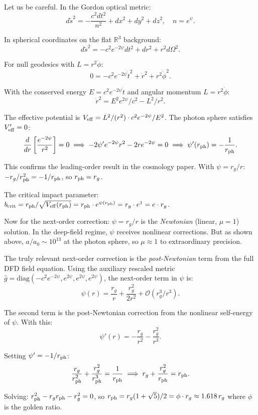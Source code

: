 \documentclass[11pt]{article}
\begin{document}
Let us be careful. In the Gordon optical metric:
\[
d\tilde{s}^2 = -\frac{c^2 dt^2}{n^2} + dx^2 + dy^2 + dz^2, \quad n = e^\psi.
\]

In spherical coordinates on the flat $\mathbb{R}^3$ background:
\[
d\tilde{s}^2 = -c^2 e^{-2\psi} dt^2 + dr^2 + r^2 d\Omega^2.
\]

For null geodesics with $L = r^2\dot\phi$:
\[
0 = -c^2 e^{-2\psi}\dot{t}^2 + \dot{r}^2 + r^2\dot\phi^2.
\]

With the conserved energy $E = c^2 e^{-2\psi}\dot{t}$ and angular momentum $L = r^2\dot\phi$:
\[
\dot{r}^2 = E^2 e^{2\psi}/c^2 - L^2/r^2.
\]

The effective potential is $V_{\rm eff} = L^2/(r^2) \cdot c^2 e^{-2\psi}/E^2$. The photon sphere satisfies $V_{\rm eff}' = 0$:
\[
\frac{d}{dr}\left[\frac{e^{-2\psi}}{r^2}\right] = 0 \implies -2\psi' e^{-2\psi} r^2 - 2r e^{-2\psi} = 0 \implies \psi'(r_{\rm ph}) = -\frac{1}{r_{\rm ph}}.
\]

This confirms the leading-order result in the cosmology paper. With $\psi = r_g/r$:
$-r_g/r_{\rm ph}^2 = -1/r_{\rm ph}$, so $r_{\rm ph} = r_g$.

The critical impact parameter: $b_{\rm crit} = r_{\rm ph}/\sqrt{V_{\rm eff}(r_{\rm ph})} = r_{\rm ph} \cdot e^{\psi(r_{\rm ph})} = r_g \cdot e^1 = e \cdot r_g$.

Now for the next-order correction: $\psi = r_g/r$ is the \emph{Newtonian} (linear, $\mu=1$) solution. In the deep-field regime, $\psi$ receives nonlinear corrections. But as shown above, $a/a_0 \sim 10^{13}$ at the photon sphere, so $\mu \approx 1$ to extraordinary precision.

The truly relevant next-order correction is the \emph{post-Newtonian} term from the full DFD field equation. Using the auxiliary rescaled metric $\hat{g} = \text{diag}(-c^2 e^{-2\psi}, e^{2\psi}, e^{2\psi}, e^{2\psi})$, the next-order term in $\psi$ is:
\[
\psi(r) = \frac{r_g}{r} + \frac{r_g^2}{2r^2} + \mathcal{O}(r_g^3/r^3).
\]

The second term is the post-Newtonian correction from the nonlinear self-energy of $\psi$. With this:
\[
\psi'(r) = -\frac{r_g}{r^2} - \frac{r_g^2}{r^3}.
\]

Setting $\psi' = -1/r_{\rm ph}$:
\[
\frac{r_g}{r_{\rm ph}^2} + \frac{r_g^2}{r_{\rm ph}^3} = \frac{1}{r_{\rm ph}} \implies r_g + \frac{r_g^2}{r_{\rm ph}} = r_{\rm ph}.
\]

Solving: $r_{\rm ph}^2 - r_g r_{\rm ph} - r_g^2 = 0$, so $r_{\rm ph} = r_g(1+\sqrt{5})/2 = \phi \cdot r_g \approx 1.618\,r_g$ where $\phi$ is the golden ratio.
\end{document}
